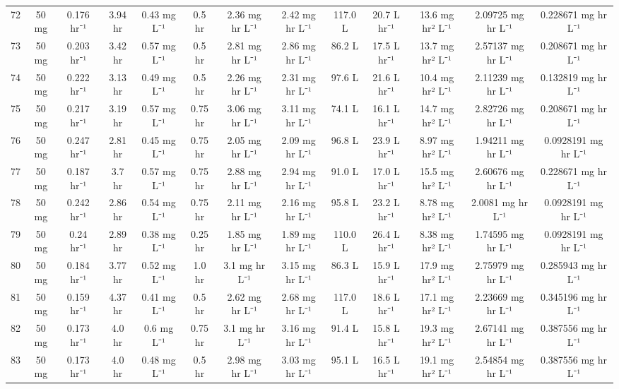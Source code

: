 \documentclass[12pt,a4paper]{article}
\begin{document}
\begin{tabular}{r|cccccccccccc}
	72 & 50 mg & 0.176 hr⁻¹ & 3.94 hr & 0.43 mg L⁻¹ & 0.5 hr & 2.36 mg hr L⁻¹ & 2.42 mg hr L⁻¹ & 117.0 L & 20.7 L hr⁻¹ & 13.6 mg hr² L⁻¹ & 2.09725 mg hr L⁻¹ & 0.228671 mg hr L⁻¹ \\
	73 & 50 mg & 0.203 hr⁻¹ & 3.42 hr & 0.57 mg L⁻¹ & 0.5 hr & 2.81 mg hr L⁻¹ & 2.86 mg hr L⁻¹ & 86.2 L & 17.5 L hr⁻¹ & 13.7 mg hr² L⁻¹ & 2.57137 mg hr L⁻¹ & 0.208671 mg hr L⁻¹ \\
	74 & 50 mg & 0.222 hr⁻¹ & 3.13 hr & 0.49 mg L⁻¹ & 0.5 hr & 2.26 mg hr L⁻¹ & 2.31 mg hr L⁻¹ & 97.6 L & 21.6 L hr⁻¹ & 10.4 mg hr² L⁻¹ & 2.11239 mg hr L⁻¹ & 0.132819 mg hr L⁻¹ \\
	75 & 50 mg & 0.217 hr⁻¹ & 3.19 hr & 0.57 mg L⁻¹ & 0.75 hr & 3.06 mg hr L⁻¹ & 3.11 mg hr L⁻¹ & 74.1 L & 16.1 L hr⁻¹ & 14.7 mg hr² L⁻¹ & 2.82726 mg hr L⁻¹ & 0.208671 mg hr L⁻¹ \\
	76 & 50 mg & 0.247 hr⁻¹ & 2.81 hr & 0.45 mg L⁻¹ & 0.75 hr & 2.05 mg hr L⁻¹ & 2.09 mg hr L⁻¹ & 96.8 L & 23.9 L hr⁻¹ & 8.97 mg hr² L⁻¹ & 1.94211 mg hr L⁻¹ & 0.0928191 mg hr L⁻¹ \\
	77 & 50 mg & 0.187 hr⁻¹ & 3.7 hr & 0.57 mg L⁻¹ & 0.75 hr & 2.88 mg hr L⁻¹ & 2.94 mg hr L⁻¹ & 91.0 L & 17.0 L hr⁻¹ & 15.5 mg hr² L⁻¹ & 2.60676 mg hr L⁻¹ & 0.228671 mg hr L⁻¹ \\
	78 & 50 mg & 0.242 hr⁻¹ & 2.86 hr & 0.54 mg L⁻¹ & 0.75 hr & 2.11 mg hr L⁻¹ & 2.16 mg hr L⁻¹ & 95.8 L & 23.2 L hr⁻¹ & 8.78 mg hr² L⁻¹ & 2.0081 mg hr L⁻¹ & 0.0928191 mg hr L⁻¹ \\
	79 & 50 mg & 0.24 hr⁻¹ & 2.89 hr & 0.38 mg L⁻¹ & 0.25 hr & 1.85 mg hr L⁻¹ & 1.89 mg hr L⁻¹ & 110.0 L & 26.4 L hr⁻¹ & 8.38 mg hr² L⁻¹ & 1.74595 mg hr L⁻¹ & 0.0928191 mg hr L⁻¹ \\
	80 & 50 mg & 0.184 hr⁻¹ & 3.77 hr & 0.52 mg L⁻¹ & 1.0 hr & 3.1 mg hr L⁻¹ & 3.15 mg hr L⁻¹ & 86.3 L & 15.9 L hr⁻¹ & 17.9 mg hr² L⁻¹ & 2.75979 mg hr L⁻¹ & 0.285943 mg hr L⁻¹ \\
	81 & 50 mg & 0.159 hr⁻¹ & 4.37 hr & 0.41 mg L⁻¹ & 0.5 hr & 2.62 mg hr L⁻¹ & 2.68 mg hr L⁻¹ & 117.0 L & 18.6 L hr⁻¹ & 17.1 mg hr² L⁻¹ & 2.23669 mg hr L⁻¹ & 0.345196 mg hr L⁻¹ \\
	82 & 50 mg & 0.173 hr⁻¹ & 4.0 hr & 0.6 mg L⁻¹ & 0.75 hr & 3.1 mg hr L⁻¹ & 3.16 mg hr L⁻¹ & 91.4 L & 15.8 L hr⁻¹ & 19.3 mg hr² L⁻¹ & 2.67141 mg hr L⁻¹ & 0.387556 mg hr L⁻¹ \\
	83 & 50 mg & 0.173 hr⁻¹ & 4.0 hr & 0.48 mg L⁻¹ & 0.5 hr & 2.98 mg hr L⁻¹ & 3.03 mg hr L⁻¹ & 95.1 L & 16.5 L hr⁻¹ & 19.1 mg hr² L⁻¹ & 2.54854 mg hr L⁻¹ & 0.387556 mg hr L⁻¹ \\

\end{tabular}
\end{document}
